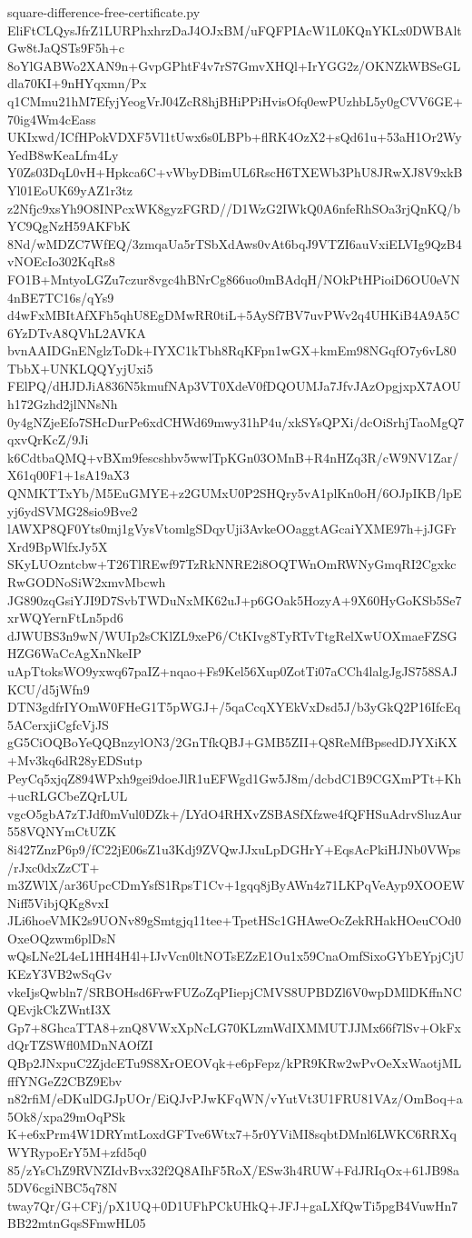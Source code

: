 \documentclass[11pt]{article}
\theoremstyle{definition}
\theoremstyle{remark}
\begin{document}
\begin{filecontents*}[overwrite]{square-difference-free-certificate.py}
EliFtCLQysJfrZ1LURPhxhrzDaJ4OJxBM/uFQFPIAcW1L0KQnYKLx0DWBAltGw8tJaQSTs9F5h+c
8oYlGABWo2XAN9n+GvpGPhtF4v7rS7GmvXHQl+IrYGG2z/OKNZkWBSeGLdla70KI+9nHYqxmn/Px
q1CMmu21hM7EfyjYeogVrJ04ZcR8hjBHiPPiHvisOfq0ewPUzhbL5y0gCVV6GE+70ig4Wm4cEass
UKIxwd/ICfHPokVDXF5Vl1tUwx6s0LBPb+flRK4OzX2+sQd61u+53aH1Or2WyYedB8wKeaLfm4Ly
Y0Zs03DqL0vH+Hpkca6C+vWbyDBimUL6RscH6TXEWb3PhU8JRwXJ8V9xkBYl01EoUK69yAZ1r3tz
z2Nfjc9xsYh9O8INPcxWK8gyzFGRD//D1WzG2IWkQ0A6nfeRhSOa3rjQnKQ/bYC9QgNzH59AKFbK
8Nd/wMDZC7WfEQ/3zmqaUa5rTSbXdAws0vAt6bqJ9VTZI6auVxiELVIg9QzB4vNOEcIo302KqRs8
FO1B+MntyoLGZu7czur8vgc4hBNrCg866uo0mBAdqH/NOkPtHPioiD6OU0eVN4nBE7TC16s/qYs9
d4wFxMBItAfXFh5qhU8EgDMwRR0tiL+5AySf7BV7uvPWv2q4UHKiB4A9A5C6YzDTvA8QVhL2AVKA
bvnAAIDGnENglzToDk+IYXC1kTbh8RqKFpn1wGX+kmEm98NGqfO7y6vL80TbbX+UNKLQQYyjUxi5
FElPQ/dHJDJiA836N5kmufNAp3VT0XdeV0fDQOUMJa7JfvJAzOpgjxpX7AOUh172Gzhd2jlNNsNh
0y4gNZjeEfo7SHcDurPe6xdCHWd69mwy31hP4u/xkSYsQPXi/dcOiSrhjTaoMgQ7qxvQrKcZ/9Ji
k6CdtbaQMQ+vBXm9fescshbv5wwlTpKGn03OMnB+R4nHZq3R/cW9NV1Zar/X61q00F1+1sA19aX3
QNMKTTxYb/M5EuGMYE+z2GUMxU0P2SHQry5vA1plKn0oH/6OJpIKB/lpEyj6ydSVMG28sio9Bve2
lAWXP8QF0Yts0mj1gVysVtomlgSDqyUji3AvkeOOaggtAGcaiYXME97h+jJGFrXrd9BpWlfxJy5X
SKyLUOzntcbw+T26TlREwf97TzRkNNRE2i8OQTWnOmRWNyGmqRI2CgxkcRwGODNoSiW2xmvMbcwh
JG890zqGsiYJI9D7SvbTWDuNxMK62uJ+p6GOak5HozyA+9X60HyGoKSb5Se7xrWQYernFtLn5pd6
dJWUBS3n9wN/WUIp2sCKlZL9xeP6/CtKIvg8TyRTvTtgRelXwUOXmaeFZSGHZG6WaCcAgXnNkeIP
uApTtoksWO9yxwq67paIZ+nqao+Fs9Kel56Xup0ZotTi07aCCh4lalgJgJS758SAJKCU/d5jWfn9
DTN3gdfrIYOmW0FHeG1T5pWGJ+/5qaCcqXYEkVxDsd5J/b3yGkQ2P16IfcEq5ACerxjiCgfcVjJS
gG5CiOQBoYeQQBnzylON3/2GnTfkQBJ+GMB5ZII+Q8ReMfBpsedDJYXiKX+Mv3kq6dR28yEDSutp
PeyCq5xjqZ894WPxh9gei9doeJlR1uEFWgd1Gw5J8m/dcbdC1B9CGXmPTt+Kh+ucRLGCbeZQrLUL
vgcO5gbA7zTJdf0mVul0DZk+/LYdO4RHXvZSBASfXfzwe4fQFHSuAdrvSluzAur558VQNYmCtUZK
8i427ZnzP6p9/fC22jE06sZ1u3Kdj9ZVQwJJxuLpDGHrY+EqsAcPkiHJNb0VWps/rJxc0dxZzCT+
m3ZWlX/ar36UpcCDmYsfS1RpsT1Cv+1gqq8jByAWn4z71LKPqVeAyp9XOOEWNiff5VibjQKg8vxI
JLi6hoeVMK2s9UONv89gSmtgjq11tee+TpetHSc1GHAweOcZekRHakHOeuCOd0OxeOQzwm6plDsN
wQsLNe2L4eL1HH4H4l+IJvVcn0ltNOTsEZzE1Ou1x59CnaOmfSixoGYbEYpjCjUKEzY3VB2wSqGv
vkeIjsQwbln7/SRBOHsd6FrwFUZoZqPIiepjCMVS8UPBDZl6V0wpDMlDKffnNCQEvjkCkZWntI3X
Gp7+8GhcaTTA8+znQ8VWxXpNcLG70KLzmWdIXMMUTJJMx66f7lSv+OkFxdQrTZSWfl0MDnNAOfZI
QBp2JNxpuC2ZjdcETu9S8XrOEOVqk+e6pFepz/kPR9KRw2wPvOeXxWaotjMLfffYNGeZ2CBZ9Ebv
n82rfiM/eDKulDGJpUOr/EiQJvPJwKFqWN/vYutVt3U1FRU81VAz/OmBoq+a5Ok8/xpa29mOqPSk
K+e6xPrm4W1DRYmtLoxdGFTve6Wtx7+5r0YViMI8sqbtDMnl6LWKC6RRXqWYRypoErY5M+zfd5q0
85/zYsChZ9RVNZIdvBvx32f2Q8AIhF5RoX/ESw3h4RUW+FdJRIqOx+61JB98a5DV6cgiNBC5q78N
tway7Qr/G+CFj/pX1UQ+0D1UFhPCkUHkQ+JFJ+gaLXfQwTi5pgB4VuwHn7BB22mtnGqsSFmwHL05

\end{filecontents*}
\end{document}
